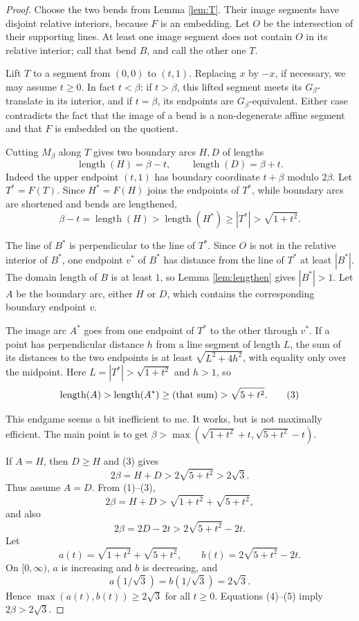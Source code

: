 \documentclass[12pt]{article}
\newcommand{\ellg}{\operatorname{length}}
\newcommand{\review}[1]{\begin{reviewbox}#1\end{reviewbox}}
\begin{document}
\begin{proof}
Choose the two bends from Lemma \ref{lem:T}.  Their image segments have
disjoint relative interiors, because \(F\) is an embedding.  Let \(O\) be
the intersection of their supporting lines.  At least one image segment
does not contain \(O\) in its relative interior; call that bend \(B\), and
call the other one \(T\).

Lift \(T\) to a segment from \((0,0)\) to \((t,1)\).  Replacing \(x\) by
\(-x\), if necessary, we may assume \(t\ge0\).  In fact \(t<\beta\): if
\(t>\beta\), this lifted segment meets its \(G_\beta\)-translate in its
interior, and if \(t=\beta\), its endpoints are \(G_\beta\)-equivalent.
Either case contradicts the fact that the image of a bend is a
non-degenerate affine segment and that \(F\) is embedded on the quotient.

Cutting \(M_\beta\) along \(T\) gives two boundary arcs \(H,D\) of lengths
\[
        \ellg(H)=\beta-t,\qquad \ellg(D)=\beta+t.        \tag{1}
\]
Indeed the upper endpoint \((t,1)\) has boundary coordinate \(t+\beta\)
modulo \(2\beta\).  Let \(T^*=F(T)\).  Since \(H^*=F(H)\) joins the
endpoints of \(T^*\), while boundary arcs are shortened and bends are
lengthened,
\[
        \beta-t=\ellg(H)>\ellg(H^*)\ge |T^*|>\sqrt{1+t^2}.       \tag{2}
\]

The line of \(B^*\) is perpendicular to the line of \(T^*\).  Since \(O\)
is not in the relative interior of \(B^*\), one endpoint \(v^*\) of
\(B^*\) has distance from the line of \(T^*\) at least \(|B^*|\).  The
domain length of \(B\) is at least \(1\), so Lemma \ref{lem:lengthen}
gives \(|B^*|>1\).  Let \(A\) be the boundary arc, either \(H\) or \(D\),
which contains the corresponding boundary endpoint \(v\).

The image arc \(A^*\) goes from one endpoint of \(T^*\) to the other
through \(v^*\).  If a point has perpendicular distance \(h\) from a line
segment of length \(L\), the sum of its distances to the two endpoints is
at least \(\sqrt{L^2+4h^2}\), with equality only over the midpoint.  Here
\(L=|T^*|>\sqrt{1+t^2}\) and \(h>1\), so
\[
        \ellg(A)>\ellg(A^*)\ge
        \hbox{(that sum)}>\sqrt{5+t^2}.                  \tag{3}
\]


\review{This endgame seems a bit inefficient to me. It works, but is not maximally efficient.  The main point is to get $\beta>\max(\sqrt{1+t^2}+t,\sqrt{5+t^2}-t).$}

If \(A=H\), then \(D\ge H\) and (3) gives
\[
        2\beta=H+D>2\sqrt{5+t^2}>2\sqrt3.
\]
Thus assume \(A=D\).  From (1)--(3),
\[
 2\beta=H+D>\sqrt{1+t^2}+\sqrt{5+t^2},                         \tag{4}
\]
and also
\[
 2\beta=2D-2t>2\sqrt{5+t^2}-2t.                                \tag{5}
\]
Let
\[
 a(t)=\sqrt{1+t^2}+\sqrt{5+t^2},\qquad
 b(t)=2\sqrt{5+t^2}-2t .
\]
On \([0,\infty)\), \(a\) is increasing and \(b\) is decreasing, and
\[
        a(1/\sqrt3)=b(1/\sqrt3)=2\sqrt3 .
\]
Hence \(\max(a(t),b(t))\ge2\sqrt3\) for all \(t\ge0\).  Equations
(4)--(5) imply \(2\beta>2\sqrt3\).
\end{proof}
\end{document}
